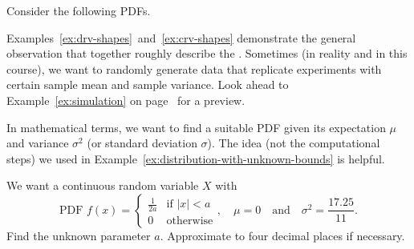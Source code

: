 \documentclass[../main.tex]{subfiles}
\begin{document}
\begin{example} \label{ex:crv-shapes}
  Consider the following PDFs.

  \begin{center}

  \end{center}
\end{example}
\clearpage

Examples~\ref{ex:drv-shapes}~and~\ref{ex:crv-shapes} demonstrate the general observation that  together roughly describe the .  Sometimes (in reality and in this course), we want to randomly generate data that replicate experiments with certain sample mean and sample variance.  Look ahead to Example~\ref{ex:simulation} on page~\pageref{ex:simulation} for a preview.

In mathematical terms, we want to find a suitable PDF given its expectation \(\mu\) and variance \(\sigma^{2}\) (or standard deviation \(\sigma\)). The idea (not the computational steps) we used in Example~\ref{ex:distribution-with-unknown-bounds} is helpful.

\begin{example} \label{ex:uniform-distribution-from-mean-and-stddev}
  We want a continuous random variable \(X\) with 
  \[
    \text{PDF }
    f(x) = 
    \begin{cases}
      \frac{1}{2a} & \text{if } |x| < a \\
      0 & \text{otherwise}
    \end{cases},
    \quad
    \mu = 0 \quad\text{and}\quad \sigma^{2} = \frac{17.25}{11}.
  \]
  Find the unknown parameter \(a\). Approximate to four decimal places if necessary.

\end{example}
\clearpage
\end{document}
